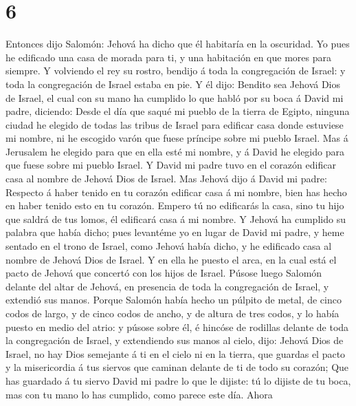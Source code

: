 \hypertarget{section-5}{%
\section{6}\label{section-5}}

 Entonces dijo Salomón: Jehová ha dicho que él habitaría
en la oscuridad.  Yo pues he edificado una casa de morada
para ti, y una habitación en que mores para siempre.  Y
volviendo el rey su rostro, bendijo á toda la congregación de Israel: y
toda la congregación de Israel estaba en pie.  Y él dijo:
Bendito sea Jehová Dios de Israel, el cual con su mano ha cumplido lo
que habló por su boca á David mi padre, diciendo:  Desde
el día que saqué mi pueblo de la tierra de Egipto, ninguna ciudad he
elegido de todas las tribus de Israel para edificar casa donde estuviese
mi nombre, ni he escogido varón que fuese príncipe sobre mi pueblo
Israel.  Mas á Jerusalem he elegido para que en ella esté
mi nombre, y á David he elegido para que fuese sobre mi pueblo Israel.
 Y David mi padre tuvo en el corazón edificar casa al
nombre de Jehová Dios de Israel.  Mas Jehová dijo á David
mi padre: Respecto á haber tenido en tu corazón edificar casa á mi
nombre, bien has hecho en haber tenido esto en tu corazón.
 Empero tú no edificarás la casa, sino tu hijo que saldrá
de tus lomos, él edificará casa á mi nombre.  Y Jehová ha
cumplido su palabra que había dicho; pues levantéme yo en lugar de David
mi padre, y heme sentado en el trono de Israel, como Jehová había dicho,
y he edificado casa al nombre de Jehová Dios de Israel. 
Y en ella he puesto el arca, en la cual está el pacto de Jehová que
concertó con los hijos de Israel.  Púsose luego Salomón
delante del altar de Jehová, en presencia de toda la congregación de
Israel, y extendió sus manos.  Porque Salomón había hecho
un púlpito de metal, de cinco codos de largo, y de cinco codos de ancho,
y de altura de tres codos, y lo había puesto en medio del atrio: y
púsose sobre él, é hincóse de rodillas delante de toda la congregación
de Israel, y extendiendo sus manos al cielo, dijo: 
Jehová Dios de Israel, no hay Dios semejante á ti en el cielo ni en la
tierra, que guardas el pacto y la misericordia á tus siervos que caminan
delante de ti de todo su corazón;  Que has guardado á tu
siervo David mi padre lo que le dijiste: tú lo dijiste de tu boca, mas
con tu mano lo has cumplido, como parece este día.  Ahora
